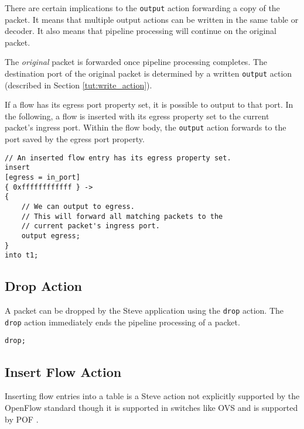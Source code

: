 There are certain implications to the \texttt{output} action forwarding a copy of the packet. 
It means that multiple output actions can be written in
the same table or decoder. It also means that pipeline processing will continue
on the original packet.

The \textit{original} packet is forwarded once pipeline processing completes.
The destination port of the original packet is determined by a written \texttt{output}
action (described in Section \ref{tut:write_action}).

If a flow has its egress port property set, it is possible to output to that
port. In the following, a flow is inserted with its egress property set to the
current packet's ingress port. Within the flow body, the \texttt{output} action forwards
to the port saved by the egress port property.

\begin{codepage}
\begin{lstlisting}
// An inserted flow entry has its egress property set.
insert
[egress = in_port]
{ 0xffffffffffff } ->
{
	// We can output to egress.
	// This will forward all matching packets to the
	// current packet's ingress port.
	output egress;
}
into t1;
\end{lstlisting}
\end{codepage}

\subsection{Drop Action} \label{tut:drop_action}

A packet can be dropped by the Steve application using the \texttt{drop} action.
The \texttt{drop} action immediately ends the pipeline processing of a packet.

\begin{codepage}
\begin{lstlisting}
drop;
\end{lstlisting}
\end{codepage}

\subsection{Insert Flow Action} \label{tut:insert_flow_action}

Inserting flow entries into a table is a Steve action not explicitly supported
by the OpenFlow standard \cite{openflow_spec} though it is supported in
switches like OVS \cite{ovs_man_page} and is supported by POF \cite{pof, pof_fis, pof_impl}.

